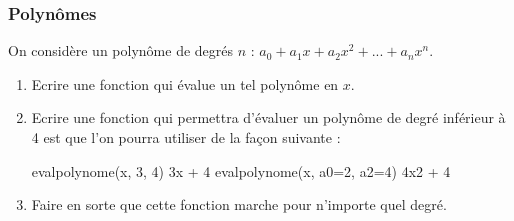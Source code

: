 \documentclass[letterpaper,10pt,english]{sphinxhowto}
\begin{document}
\subsubsection{Polynômes}
\label{\detokenize{cours1_fonctions_corr_exercices:polynomes}}
\sphinxAtStartPar
On considère un polynôme de degrés \(n\) : \(a_0 + a_1x + a_2x^2 + ... + a_n x^n\).
\begin{enumerate}
%
\item {} 
\sphinxAtStartPar
Ecrire une fonction  qui évalue un tel polynôme en \(x\).

\item {} 
\sphinxAtStartPar
Ecrire une fonction qui permettra d’évaluer un polynôme de degré inférieur à 4 est que l’on pourra utiliser de la façon suivante :

\begin{sphinxVerbatim}[commandchars=\\\{\}]
 eval\PYGZus{}polynome(x, 3, 4) \PYGZsh{} 3x + 4
 eval\PYGZus{}polynome(x, a\PYGZus{}0=2, a\PYGZus{}2=4) \PYGZsh{} 4x\PYGZca{}2 + 4
\end{sphinxVerbatim}

\item {} 
\sphinxAtStartPar
Faire en sorte que cette fonction marche pour n’importe quel degré.

\end{enumerate}
\end{document}
